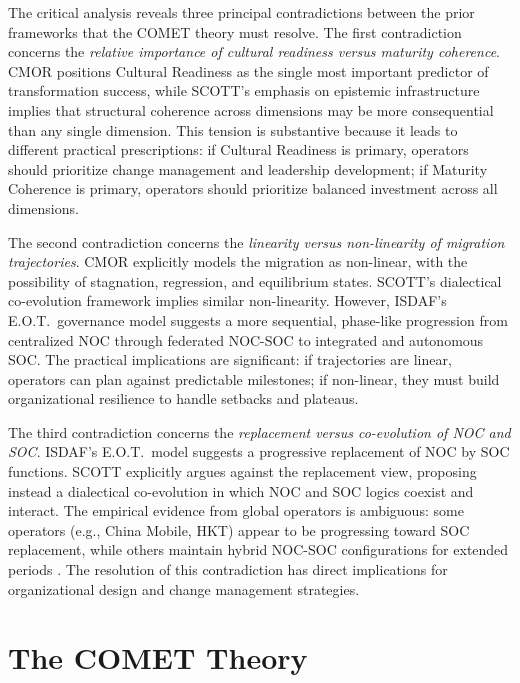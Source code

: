 \documentclass[12pt,a4paper]{article}
\begin{document}
The critical analysis reveals three principal contradictions between the prior frameworks that the COMET theory must resolve. The first contradiction concerns the \textit{relative importance of cultural readiness versus maturity coherence}. CMOR positions Cultural Readiness as the single most important predictor of transformation success, while SCOTT's emphasis on epistemic infrastructure implies that structural coherence across dimensions may be more consequential than any single dimension. This tension is substantive because it leads to different practical prescriptions: if Cultural Readiness is primary, operators should prioritize change management and leadership development; if Maturity Coherence is primary, operators should prioritize balanced investment across all dimensions.

The second contradiction concerns the \textit{linearity versus non-linearity of migration trajectories}. CMOR explicitly models the migration as non-linear, with the possibility of stagnation, regression, and equilibrium states. SCOTT's dialectical co-evolution framework implies similar non-linearity. However, ISDAF's E.O.T.\ governance model suggests a more sequential, phase-like progression from centralized NOC through federated NOC-SOC to integrated and autonomous SOC. The practical implications are significant: if trajectories are linear, operators can plan against predictable milestones; if non-linear, they must build organizational resilience to handle setbacks and plateaus.

The third contradiction concerns the \textit{replacement versus co-evolution of NOC and SOC}. ISDAF's E.O.T.\ model suggests a progressive replacement of NOC by SOC functions. SCOTT explicitly argues against the replacement view, proposing instead a dialectical co-evolution in which NOC and SOC logics coexist and interact. The empirical evidence from global operators is ambiguous: some operators (e.g., China Mobile, HKT) appear to be progressing toward SOC replacement, while others maintain hybrid NOC-SOC configurations for extended periods \citep{kley2021evolution}. The resolution of this contradiction has direct implications for organizational design and change management strategies.

\section{The COMET Theory}
\end{document}
